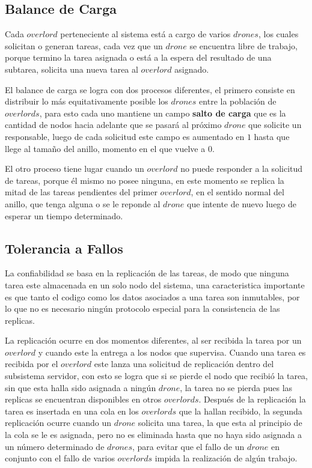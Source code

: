 \documentclass[a4paper,10pt]{article}
\begin{document}
		\pagebreak
		\subsection{Balance de Carga}			 
			
			Cada $overlord$ perteneciente al sistema está a cargo de varios $drones$, los cuales solicitan o generan tareas, cada vez que un $drone$ se encuentra libre de trabajo, porque termino la tarea asignada o está a la espera del resultado de una subtarea, solicita una nueva tarea al $overlord$ asignado.
			
			El balance de carga se logra con dos procesos diferentes, el primero consiste en distribuir lo más equitativamente posible los $drones$ entre la población de $overlords$, para esto cada uno mantiene un campo \textbf{salto de carga} que es la cantidad de nodos hacia adelante que se pasará al próximo $drone$ que solicite un responsable, luego de cada solicitud este campo es aumentado en $1$ hasta que llege al tamaño del anillo, momento en el que vuelve a $0$.
			
			El otro proceso tiene lugar cuando un $overlord$ no puede responder a la solicitud de tareas, porque él mismo no posee ninguna, en este momento se replica la mitad de las tareas pendientes del primer $overlord$, en el sentido normal del anillo, que tenga alguna o se le reponde al $drone$ que intente de nuevo luego de esperar un tiempo determinado.
		
		\subsection{Tolerancia a Fallos}
			La confiabilidad se basa en la replicación de las tareas, de modo que ninguna tarea este almacenada en un solo nodo del sistema, una caracteristica importante es que tanto el codigo como los datos asociados a una tarea son inmutables, por lo que no es necesario ningún protocolo especial para la consistencia de las replicas.
			
			La replicación ocurre en dos momentos diferentes, al ser recibida la tarea por un $overlord$ y cuando este la entrega a los nodos que supervisa. Cuando una tarea es recibida por el $overlord$ este lanza una solicitud de replicación dentro del subsistema servidor, con esto se logra que si se pierde el nodo que recibió la tarea, sin que esta halla sido asignada a ningún $drone$, la tarea no se pierda pues las replicas se encuentran disponibles en otros $overlords$. Después de la replicación la tarea es insertada en una cola en los $overlords$ que la hallan recibido, la segunda replicación ocurre cuando un $drone$ solicita una tarea, la que esta al principio de la cola se le es asignada, pero no es eliminada hasta que no haya sido asignada a un número determinado de $drones$, para evitar que el fallo de un $drone$ en conjunto con el fallo de varios $overlords$ impida la realización de algún trabajo.
\end{document}
